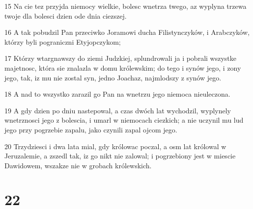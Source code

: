 \par 15 Na cie tez przyjda niemocy wielkie, bolesc wnetrza twego, az wyplyna trzewa twoje dla bolesci dzien ode dnia ciezszej.
\par 16 A tak pobudzil Pan przeciwko Joramowi ducha Filistynczyków, i Arabczyków, którzy byli pograniczni Etyjopczykom;
\par 17 Którzy wtargnawszy do ziemi Judzkiej, splundrowali ja i pobrali wszystke majetnosc, która sie znalazla w domu królewskim; do tego i synów jego, i zony jego, tak, iz mu nie zostal syn, jedno Joachaz, najmlodszy z synów jego.
\par 18 A nad to wszystko zarazil go Pan na wnetrzu jego niemoca nieuleczona.
\par 19 A gdy dzien po dniu nastepowal, a czas dwóch lat wychodzil, wyplynely wnetrznosci jego z bolescia, i umarl w niemocach ciezkich; a nie uczynil mu lud jego przy pogrzebie zapalu, jako czynili zapal ojcom jego.
\par 20 Trzydziesci i dwa lata mial, gdy królowac poczal, a osm lat królowal w Jeruzalemie, a zszedl tak, iz go nikt nie zalowal; i pogrzebiony jest w miescie Dawidowem, wszakze nie w grobach królewskich.

\chapter{22}

